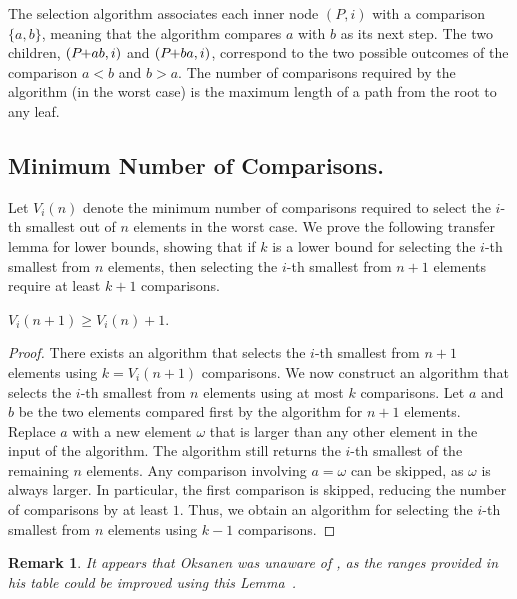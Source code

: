 \documentclass[twoside,leqno,twocolumn]{article}
\newcommand{\pchild}[3]{{#1}\kern-1pt{+}{#2}{#3}}
\newtheorem{remark}{Remark}[section]
\begin{document}
The selection algorithm associates each inner node $(P, i)$ with a comparison $\{a, b\}$, meaning that the algorithm compares $a$ with $b$ as its next step.
The two children, $(\pchild{P}{a}{b}, i)$ and $(\pchild{P}{b}{a}, i)$, correspond to the two possible outcomes of the comparison $a < b$ and $b > a$.
The number of comparisons required by the algorithm (in the worst case) is the maximum length of a path from the root to any leaf.


\subsection{Minimum Number of Comparisons.}

Let $V_i(n)$ denote the minimum number of comparisons required to select the $i$-th smallest out of $n$ elements in the worst case.
We prove the following transfer lemma for lower bounds, showing that if $k$ is a lower bound for selecting the $i$-th smallest from $n$ elements, then selecting the $i$-th smallest from $n + 1$ elements require at least $k + 1$ comparisons.

\begin{lemma} \label{lemma:previous_next_poset}
  $V_i(n + 1) \geq V_i(n) + 1$.
\end{lemma}

\begin{proof}
  There exists an algorithm that selects the $i$-th smallest from $n + 1$ elements using $k = V_i(n + 1)$ comparisons.
  We now construct an algorithm that selects the $i$-th smallest from $n$ elements using at most $k$ comparisons.
  Let $a$ and $b$ be the two elements compared first by the algorithm for $n + 1$ elements.
  Replace $a$ with a new element $\omega$ that is larger than any other element in the input of the algorithm.
  The algorithm still returns the $i$-th smallest of the remaining $n$ elements.
  Any comparison involving $a = \omega$ can be skipped, as $\omega$ is always larger.
  In particular, the first comparison is skipped, reducing the number of comparisons by at least $1$.
  Thus, we obtain an algorithm for selecting the $i$-th smallest from $n$ elements using $k - 1$ comparisons.
\end{proof}

\begin{remark}
  It appears that Oksanen was unaware of , as the ranges provided in his table could be improved using this Lemma~\cite{Oksanen}.
\end{remark}
\end{document}
